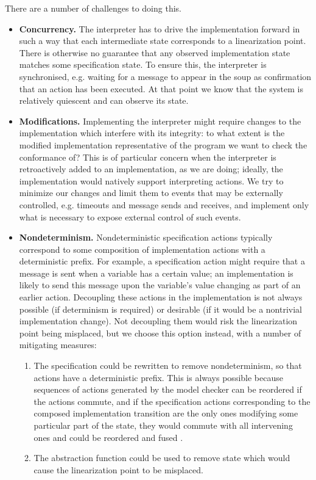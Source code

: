 \documentclass[a4paper]{article}
\begin{document}
There are a number of challenges to doing this.

\begin{itemize}
\item \textbf{Concurrency.} The interpreter has to drive the implementation forward in such a way that each intermediate state corresponds to a linearization point. There is otherwise no guarantee that any observed implementation state matches some specification state. To ensure this, the interpreter is synchronised, e.g. waiting for a message to appear in the soup as confirmation that an action has been executed. At that point we know that the system is relatively quiescent and can observe its state.

\item \textbf{Modifications.} Implementing the interpreter might require changes to the implementation which interfere with its integrity: to what extent is the modified implementation representative of the program we want to check the conformance of? This is of particular concern when the interpreter is retroactively added to an implementation, as we are doing; ideally, the implementation would natively support interpreting actions. We try to minimize our changes and limit them to events that may be externally controlled, e.g. timeouts and message sends and receives, and implement only what is necessary to expose external control of such events.


\item \textbf{Nondeterminism.} Nondeterministic specification actions typically correspond to some composition of implementation actions with a deterministic prefix. For example, a specification action might require that a message is sent when a variable has a certain value; an implementation is likely to send this message upon the variable's value changing as part of an earlier action. Decoupling these actions in the implementation is not always possible (if determinism is required) or desirable (if it would be a nontrivial implementation change). Not decoupling them would risk the linearization point being misplaced, but we choose this option instead, with a number of mitigating measures:

\begin{enumerate}
\item The specification could be rewritten to remove nondeterminism, so that actions have a deterministic prefix. This is always possible because sequences of actions generated by the model checker can be reordered if the actions commute, and if the specification actions corresponding to the composed implementation transition are the only ones modifying some particular part of the state, they would commute with all intervening ones and could be reordered and fused \cite{lipton1975reduction}.
\item The abstraction function could be used to remove state which would cause the linearization point to be misplaced.
\end{enumerate}

\end{itemize}
\end{document}
